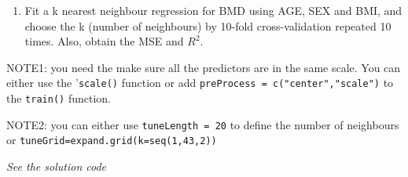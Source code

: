 \documentclass[
]{book}
\newenvironment{Shaded}{\begin{snugshade}}{\end{snugshade}}
\newcommand{\AttributeTok}[1]{\textcolor[rgb]{0.13,0.29,0.53}{#1}}
\newcommand{\CommentTok}[1]{\textcolor[rgb]{0.56,0.35,0.01}{\textit{#1}}}
\newcommand{\DecValTok}[1]{\textcolor[rgb]{0.00,0.00,0.81}{#1}}
\newcommand{\FunctionTok}[1]{\textcolor[rgb]{0.13,0.29,0.53}{\textbf{#1}}}
\newcommand{\NormalTok}[1]{#1}
\newcommand{\OtherTok}[1]{\textcolor[rgb]{0.56,0.35,0.01}{#1}}
\newcommand{\SpecialCharTok}[1]{\textcolor[rgb]{0.81,0.36,0.00}{\textbf{#1}}}
\newcommand{\StringTok}[1]{\textcolor[rgb]{0.31,0.60,0.02}{#1}}
\providecommand{\tightlist}{%
  \setlength{\itemsep}{0pt}\setlength{\parskip}{0pt}}
\begin{document}
\begin{enumerate}
\def\labelenumi{\arabic{enumi})}
\setcounter{enumi}{1}
\tightlist
\item
  Fit a k nearest neighbour regression for BMD using AGE, SEX and BMI,
  and choose the k (number of neighbours) by 10-fold cross-validation
  repeated 10 times. Also, obtain the MSE and \(R^2\).
\end{enumerate}

NOTE1: you need the make sure all the predictors are in the same scale. You can
either use the '\texttt{scale()} function or add \texttt{preProcess\ =\ c("center","scale")} to
the \texttt{train()} function.

NOTE2: you can either use \texttt{tuneLength\ =\ 20} to define the number of neighbours
or \texttt{tuneGrid=expand.grid(k=seq(1,43,2))}

\emph{See the solution code}

\begin{Shaded}
\end{Shaded}
\end{document}
